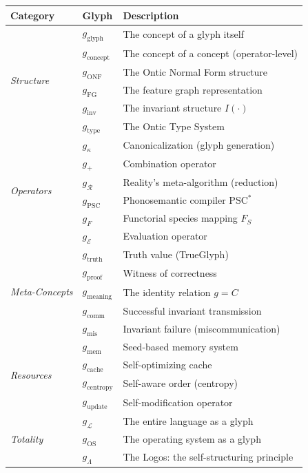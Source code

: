 \documentclass[12pt, letterpaper]{book}
\def\equiv{=}%
\def\oplus{+}%
\def\mathfrak#1{#1}%
\begin{document}
\begin{center}
\small
\begin{tabular}{llp{6.5cm}}
\toprule
\textbf{Category} & \textbf{Glyph} & \textbf{Description} \\
\midrule
\multirow{6}{*}{\textit{Structure}} & $\mathfrak{g}_{\mathrm{glyph}}$ & The concept of a glyph itself \\
 & $\mathfrak{g}_{\mathrm{concept}}$ & The concept of a concept (operator-level) \\
 & $\mathfrak{g}_{\mathrm{ONF}}$ & The Ontic Normal Form structure \\
 & $\mathfrak{g}_{\mathrm{FG}}$ & The feature graph representation \\
 & $\mathfrak{g}_{\mathrm{inv}}$ & The invariant structure $I(\cdot)$ \\
 & $\mathfrak{g}_{\mathrm{type}}$ & The Ontic Type System \\
\midrule
\multirow{6}{*}{\textit{Operators}} & $\mathfrak{g}_\kappa$ & Canonicalization (glyph generation) \\
 & $\mathfrak{g}_\oplus$ & Combination operator \\
 & $\mathfrak{g}_\mathcal{R}$ & Reality's meta-algorithm (reduction) \\
 & $\mathfrak{g}_{\mathrm{PSC}}$ & Phonosemantic compiler $\mathrm{PSC}^*$ \\
 & $\mathfrak{g}_{F}$ & Functorial species mapping $F_S$ \\
 & $\mathfrak{g}_\mathcal{E}$ & Evaluation operator \\
\midrule
\multirow{5}{*}{\textit{Meta-Concepts}} & $\mathfrak{g}_{\mathrm{truth}}$ & Truth value (TrueGlyph) \\
 & $\mathfrak{g}_{\mathrm{proof}}$ & Witness of correctness \\
 & $\mathfrak{g}_{\mathrm{meaning}}$ & The identity relation $\mathfrak{g} \equiv C$ \\
 & $\mathfrak{g}_{\mathrm{comm}}$ & Successful invariant transmission \\
 & $\mathfrak{g}_{\mathrm{mis}}$ & Invariant failure (miscommunication) \\
\midrule
\multirow{4}{*}{\textit{Resources}} & $\mathfrak{g}_{\mathrm{mem}}$ & Seed-based memory system \\
 & $\mathfrak{g}_{\mathrm{cache}}$ & Self-optimizing cache \\
 & $\mathfrak{g}_{\mathrm{centropy}}$ & Self-aware order (centropy) \\
 & $\mathfrak{g}_{\mathrm{update}}$ & Self-modification operator \\
\midrule
\multirow{3}{*}{\textit{Totality}} & $\mathfrak{g}_\mathcal{L}$ & The entire language as a glyph \\
 & $\mathfrak{g}_{\mathrm{OS}}$ & The operating system as a glyph \\
 & $\mathfrak{g}_\Lambda$ & The Logos: the self-structuring principle \\
\bottomrule
\end{tabular}
\end{center}
\end{document}
